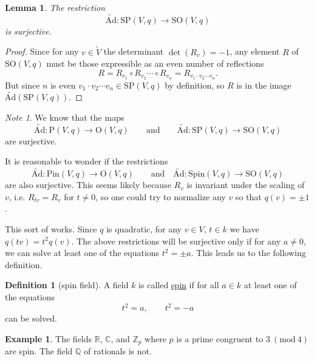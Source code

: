 \documentclass[a4paper]{report}
\newcommand{\R}{\mathbb{R}}
\newcommand{\C}{\mathbb{C}}
\newcommand{\Z}{\mathbb{Z}}
\newcommand{\Q}{\mathbb{Q}}
\newcommand{\defn}[1]{\ul{#1}}
\newcommand{\tAd}{\widetilde{\mathrm{Ad}}}
\newcommand{\Pin}{\mathrm{Pin}}
\newcommand{\Spin}{\mathrm{Spin}}
\newcommand{\Or}{\mathrm{O}}
\newcommand{\SO}{\mathrm{SO}}
\newcommand{\PP}{\mathrm{P}}
\newcommand{\SP}{\mathrm{SP}}
\theoremstyle{definition}
\newtheorem{definition}{Definition}[section]
\newtheorem{example}{Example}[section]
\theoremstyle{plain}
\newtheorem{lemma}{Lemma}[section]
\theoremstyle{remark}
\newtheorem{note}{Note}[section]
\begin{document}
\begin{lemma}
  The restriction 
  \begin{equation*}
    \tAd\colon \SP(V, q) \to \SO(V, q)
  \end{equation*}
  is surjective.
\end{lemma}
\begin{proof}
  Since for any $v \in \tilde{V}$ the determinant $\det(R_{v}) = -1$, any element $R$ of $\SO(V, q)$ must be those expressible as an even number of reflections 
  \begin{equation*}
    R = R_{v_{1}} \circ R_{v_{2}} \cdots \circ R_{v_{n}} = R_{v_{1} \cdot v_{2} \cdots v_{n}}.
  \end{equation*}
  But since $n$ is even $v_{1} \cdot v_{2} \cdots v_{n} \in \SP(V, q)$ by definition, so $R$ is in the image $\tAd(\SP(V, q))$.
\end{proof}

\begin{note}
  We know that the maps
  \begin{equation*}
    \tAd\colon \PP(V, q) \to \Or(V, q)\qquad\text{and}\qquad \tAd\colon \SP(V, q) \to \SO(V, q)
  \end{equation*}
  are surjective.

  It is reasonable to wonder if the restrictions
  \begin{equation*}
    \tAd\colon \Pin(V, q) \to \Or(V, q)\qquad\text{and}\quad \tAd\colon \Spin(V, q) \to \SO(V, q)
  \end{equation*}
  are also surjective. This seems likely because $R_{v}$ is invariant under the scaling of $v$, i.e. $R_{tv} = R_{v}$ for $t \neq 0$, so one could try to normalize any $v$ so that $q(v) = \pm 1$. 

  This sort of works. Since $q$ is quadratic, for any $v \in V$, $t \in k$ we have $q(tv) = t^2 q(v)$. The above restrictions will be surjective only if for any $a \neq 0$, we can solve at least one of the equations $t^{2} = \pm a$. This leads us to the following definition.
\end{note} 
\begin{definition}[spin field]
  \label{def:spinfield}
  A field $k$ is called \defn{spin} if for all $a \in k$ at least one of the equations
  \begin{equation*}
    t^{2} = a,\qquad t^{2} = -a
  \end{equation*}
  can be solved.
\end{definition}
\begin{example}
  The fields $\R$, $\C$, and $\Z_{p}$ where $p$ is a prime congruent to $3\ (\mathrm{mod}\ 4)$ are spin. The field $\Q$ of rationals is not.
\end{example}
\end{document}
